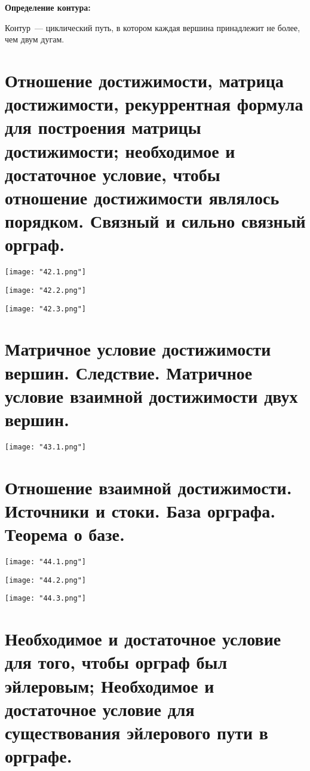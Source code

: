 \textbf{Определение контура:}    
    \smallskip

    Контур~--- циклический путь, в котором каждая вершина принадлежит не более,
    чем двум дугам.

\section{Отношение достижимости, матрица достижимости, рекуррентная формула для 
построения матрицы достижимости; необходимое и достаточное условие, чтобы 
отношение достижимости являлось порядком. Связный и сильно связный орграф.}

\begin{center}
    \texttt{[image: "42.1.png"]}
    \bigskip

    \texttt{[image: "42.2.png"]}
    \bigskip

    \texttt{[image: "42.3.png"]}
\end{center}

\section{Матричное условие достижимости вершин. Следствие. Матричное условие 
взаимной достижимости двух вершин.}

\begin{center}
    \texttt{[image: "43.1.png"]}
\end{center}

\section{Отношение взаимной достижимости. Источники и стоки. База орграфа. Теорема о 
базе.}

\begin{center}
    \texttt{[image: "44.1.png"]}
    \bigskip

    \texttt{[image: "44.2.png"]}
    \bigskip

    \texttt{[image: "44.3.png"]}
\end{center}

\section{Необходимое и достаточное условие для того, чтобы орграф был эйлеровым; 
Необходимое и достаточное условие для существования эйлерового пути в 
орграфе.}

